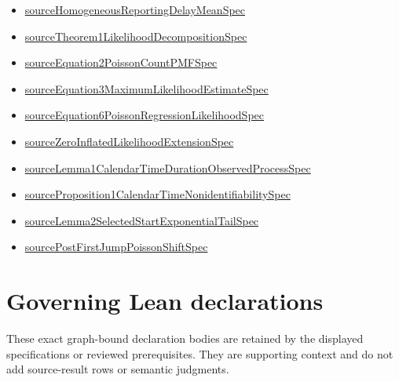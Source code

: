 \documentclass[10pt]{article}
\begin{document}
\begin{itemize}[leftmargin=1.2em]
\begin{itemize}[leftmargin=1.2em]
\item \hyperlink{source-claim-ce9253f67ee0c7eb}{source\allowbreak{}Homogeneous\allowbreak{}Reporting\allowbreak{}Delay\allowbreak{}Mean\allowbreak{}Spec}
\item \hyperlink{source-claim-7c39e59245058bff}{source\allowbreak{}Theorem1\allowbreak{}Likelihood\allowbreak{}Decomposition\allowbreak{}Spec}
\item \hyperlink{source-claim-4f511eea15da72c2}{source\allowbreak{}Equation2\allowbreak{}Poisson\allowbreak{}Count\allowbreak{}PMF\allowbreak{}Spec}
\item \hyperlink{source-claim-4e5d367d4931bb6a}{source\allowbreak{}Equation3\allowbreak{}Maximum\allowbreak{}Likelihood\allowbreak{}Estimate\allowbreak{}Spec}
\item \hyperlink{source-claim-91a0a6f8108d4306}{source\allowbreak{}Equation6\allowbreak{}Poisson\allowbreak{}Regression\allowbreak{}Likelihood\allowbreak{}Spec}
\item \hyperlink{source-claim-9e3150507c569b02}{source\allowbreak{}Zero\allowbreak{}Inflated\allowbreak{}Likelihood\allowbreak{}Extension\allowbreak{}Spec}
\item \hyperlink{source-claim-5df3c4be72017231}{source\allowbreak{}Lemma1\allowbreak{}Calendar\allowbreak{}Time\allowbreak{}Duration\allowbreak{}Observed\allowbreak{}Process\allowbreak{}Spec}
\item \hyperlink{source-claim-314139008a3bface}{source\allowbreak{}Proposition1\allowbreak{}Calendar\allowbreak{}Time\allowbreak{}Nonidentifiability\allowbreak{}Spec}
\item \hyperlink{source-claim-73044f3612c3e67c}{source\allowbreak{}Lemma2\allowbreak{}Selected\allowbreak{}Start\allowbreak{}Exponential\allowbreak{}Tail\allowbreak{}Spec}
\item \hyperlink{source-claim-7c756377fe4100a9}{source\allowbreak{}Post\allowbreak{}First\allowbreak{}Jump\allowbreak{}Poisson\allowbreak{}Shift\allowbreak{}Spec}
\end{itemize}
\end{itemize}

\clearpage
\hypertarget{governing-declaration-section-5ef5ef0364b6939c}{}
\section*{Governing Lean declarations}
These exact graph-bound declaration bodies are retained by the displayed specifications or reviewed prerequisites. They are supporting context and do not add source-result rows or semantic judgments.
\hypertarget{governing-declaration-82b7914cdb2aa374}{}
\end{document}
